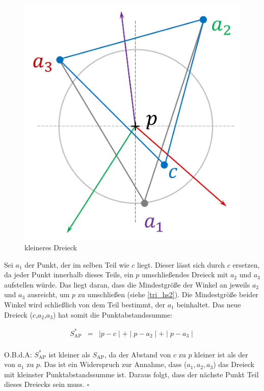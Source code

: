 \documentclass[a4paper]{extarticle}
\begin{document}
    \begin{figure}[!ht]
        \centering	
        \includegraphics[scale=0.15]{bilder/tri_3.pdf}
        \caption{kleineres Dreieck}
        \label{fig:triangulation_3}
    \end{figure}

    Sei $a_1$ der Punkt, der im selben Teil wie $c$ liegt. Dieser lässt sich durch $c$ ersetzen, 
    da jeder Punkt innerhalb dieses Teils, ein $p$ umschließendes Dreieck mit $a_2$ und $a_3$ 
    aufstellen würde. Das liegt daran, dass die Mindestgröße der 
    Winkel an jeweils $a_2$ und $a_3$ ausreicht, um $p$ zu umschließen (siehe \ref{tri_hs2}).
    Die Mindestgröße beider Winkel wird schließlich von dem Teil bestimmt, der $a_1$ beinhaltet.
    Das neue Dreieck ($c$,$a_2$,$a_3$) hat somit die Punktabstandssumme:

    \begin{eqnarray*}
        S^*_{\text{AP}} &=& \mid p - c \mid + \mid p - a_2 \mid + \mid p - a_3 \mid \\
    \end{eqnarray*}

    O.B.d.A: $S^*_{\text{AP}}$ ist kleiner als $S_{\text{AP}}$, da der Abstand von $c$ zu $p$
    kleiner ist als der von $a_1$ zu $p$. Das ist ein Widerspruch zur Annahme, dass 
    ($a_1, a_2, a_3$) das Dreieck mit kleinster Punktabstandssumme ist. Daraus folgt, dass der 
    nächste Punkt Teil dieses Dreiecks sein muss. $\square$
\end{document}
